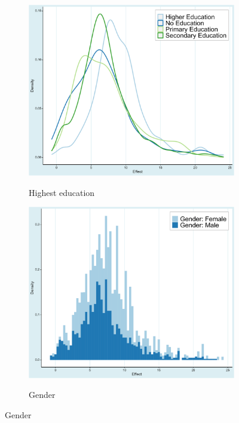 \begin{figure}[!htbp]
\begin{center}
\begin{subfigure}[!htbp]{0.38\textwidth}
   \vspace{0.2cm}
   \caption{Highest education}
   \vspace{-0.1cm}
   \includegraphics[width=0.95\linewidth]{Figures/Prima Facie/prima_facie_education.png}
   \label{fig:prima_facie_education}
\end{subfigure}
\begin{subfigure}[!htbp]{0.38\textwidth}
   \vspace{0.2cm}
   \caption{Gender}
   \vspace{-0.1cm}
   \includegraphics[width=0.95\linewidth]{Figures/Prima Facie/prima_facie_gender.png}
   \label{fig:prima_facie_gender}
\end{subfigure}


\end{center}
\end{figure}
